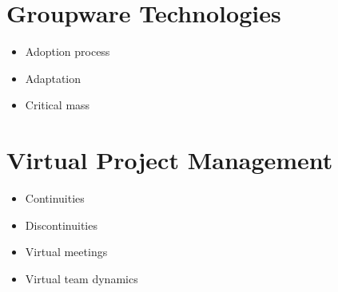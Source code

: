 \section{Groupware Technologies}
\begin{itemize}
  \item Adoption process
  \item Adaptation
  \item Critical mass
\end{itemize}

\section{Virtual Project Management}
\begin{itemize}
  \item Continuities
  \item Discontinuities
  \item Virtual meetings
	\item Virtual team dynamics
\end{itemize}